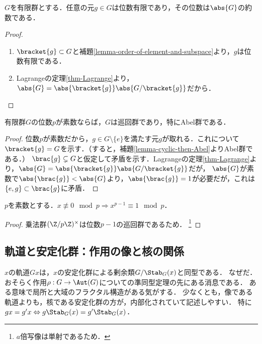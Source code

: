 \documentclass[uplatex,dvipdfmx]{jsreport}
\begin{document}
\begin{corollary}\label{cor-Lagrange}
    $G$を有限群とする．任意の元$g\in G$は位数有限であり，その位数は$\abs{G}$の約数である．
\end{corollary}
\begin{proof}\mbox{}
    \begin{enumerate}
        \item $\bracket{g}\subset G$と補題\ref{lemma-order-of-element-and-subspace}より，$g$は位数有限である．
        \item Lagrangeの定理\ref{thm-Lagrange}より，$\abs{G}=\abs{\bracket{g}}\abs{G/\bracket{g}}$だから．
    \end{enumerate}
\end{proof}

\begin{corollary}\label{cor-prime-order-then-cyclic}
    有限群$G$の位数$p$が素数ならば，$G$は巡回群であり，特にAbel群である．
\end{corollary}
\begin{proof}
    位数$p$が素数だから，$g\in G\setminus\{e\}$を満たす元$g$が取れる．これについて$\bracket{g}=G$を示す．（すると，補題\ref{lemma-cyclic-then-Abel}よりAbel群である．）
    $\brac{g}\subsetneq G$と仮定して矛盾を示す．Lagrangeの定理\ref{thm-Lagrange}より，$\abs{G}=\abs{\bracket{g}}\abs{G/\bracket{g}}$だが，
    $\abs{G}$が素数で$\abs{\brac{g}}<\abs{G}$より，$\abs{\brac{g}}=1$が必要だが，これは$\{e,g\}\subset\brac{g}$に矛盾．
\end{proof}

\begin{corollary}
    $p$を素数とする．$x\not\equiv 0\mod p\Rightarrow x^{p-1}\equiv 1\mod p$．
\end{corollary}
\begin{proof}
    乗法群$(\Z/p\Z)^\times$は位数$p-1$の巡回群であるため．
    \footnote{$a$倍写像は単射であるため．}
\end{proof}

\subsection{軌道と安定化群：作用の像と核の関係}

\begin{tcolorbox}[colframe=ForestGreen, colback=ForestGreen!10!white,breakable,colbacktitle=ForestGreen!40!white,coltitle=black,fonttitle=\bfseries\sffamily,
title=作用に対する準同型定理]
    $x$の軌道$Gx$は，$x$の安定化群による剰余類$G/\Stab_G(x)$と同型である．
    なぜだ．おそらく作用$\rho:G\to\Aut(G)$についての準同型定理の先にある消息である．
    ある意味で局所と大域のフラクタル構造がある気がする．
    少なくとも，像である軌道よりも，核である安定化群の方が，内部化されていて記述しやすい．
    特に$gx=g'x\Leftrightarrow g\Stab_G(x)=g'\Stab_G(x)$．
\end{tcolorbox}
\end{document}
